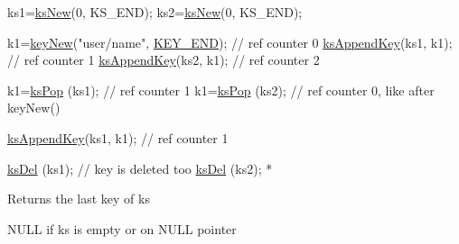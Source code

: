\begin{DoxyCode}
ks1=\hyperlink{group__keyset_ga671e1aaee3ae9dc13b4834a4ddbd2c3c}{ksNew}(0, KS\_END);
ks2=\hyperlink{group__keyset_ga671e1aaee3ae9dc13b4834a4ddbd2c3c}{ksNew}(0, KS\_END);

k1=\hyperlink{group__key_gad23c65b44bf48d773759e1f9a4d43b89}{keyNew}(\textcolor{stringliteral}{"user/name"}, \hyperlink{group__key_gga91fb3178848bd682000958089abbaf40aa8adb6fcb92dec58fb19410eacfdd403}{KEY\_END}); \textcolor{comment}{// ref counter 0}
\hyperlink{group__keyset_gaa5a1d467a4d71041edce68ea7748ce45}{ksAppendKey}(ks1, k1); \textcolor{comment}{// ref counter 1}
\hyperlink{group__keyset_gaa5a1d467a4d71041edce68ea7748ce45}{ksAppendKey}(ks2, k1); \textcolor{comment}{// ref counter 2}

k1=\hyperlink{group__keyset_gae42530b04defb772059de0600159cf69}{ksPop} (ks1); \textcolor{comment}{// ref counter 1}
k1=\hyperlink{group__keyset_gae42530b04defb772059de0600159cf69}{ksPop} (ks2); \textcolor{comment}{// ref counter 0, like after keyNew()}

\hyperlink{group__keyset_gaa5a1d467a4d71041edce68ea7748ce45}{ksAppendKey}(ks1, k1); \textcolor{comment}{// ref counter 1}

\hyperlink{group__keyset_ga27e5c16473b02a422238c8d970db7ac8}{ksDel} (ks1); \textcolor{comment}{// key is deleted too}
\hyperlink{group__keyset_ga27e5c16473b02a422238c8d970db7ac8}{ksDel} (ks2);
 *
\end{DoxyCode}


\begin{DoxyReturn}{Returns}
the last key of {\ttfamily ks} 

N\-U\-L\-L if {\ttfamily ks} is empty or on N\-U\-L\-L pointer 
\end{DoxyReturn}

